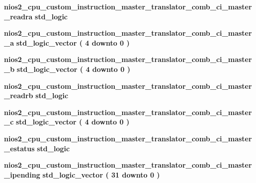 \begin{DoxyCompactItemize}
\item 
{\bf nios2\+\_\+cpu\+\_\+custom\+\_\+instruction\+\_\+master\+\_\+translator\+\_\+comb\+\_\+ci\+\_\+master\+\_\+readra} {\bfseries \textcolor{comment}{std\+\_\+logic}\textcolor{vhdlchar}{ }} 
\item 
{\bf nios2\+\_\+cpu\+\_\+custom\+\_\+instruction\+\_\+master\+\_\+translator\+\_\+comb\+\_\+ci\+\_\+master\+\_\+a} {\bfseries \textcolor{comment}{std\+\_\+logic\+\_\+vector}\textcolor{vhdlchar}{ }\textcolor{vhdlchar}{(}\textcolor{vhdlchar}{ }\textcolor{vhdlchar}{ } \textcolor{vhdldigit}{4} \textcolor{vhdlchar}{ }\textcolor{keywordflow}{downto}\textcolor{vhdlchar}{ }\textcolor{vhdlchar}{ } \textcolor{vhdldigit}{0} \textcolor{vhdlchar}{ }\textcolor{vhdlchar}{)}\textcolor{vhdlchar}{ }} 
\item 
{\bf nios2\+\_\+cpu\+\_\+custom\+\_\+instruction\+\_\+master\+\_\+translator\+\_\+comb\+\_\+ci\+\_\+master\+\_\+b} {\bfseries \textcolor{comment}{std\+\_\+logic\+\_\+vector}\textcolor{vhdlchar}{ }\textcolor{vhdlchar}{(}\textcolor{vhdlchar}{ }\textcolor{vhdlchar}{ } \textcolor{vhdldigit}{4} \textcolor{vhdlchar}{ }\textcolor{keywordflow}{downto}\textcolor{vhdlchar}{ }\textcolor{vhdlchar}{ } \textcolor{vhdldigit}{0} \textcolor{vhdlchar}{ }\textcolor{vhdlchar}{)}\textcolor{vhdlchar}{ }} 
\item 
{\bf nios2\+\_\+cpu\+\_\+custom\+\_\+instruction\+\_\+master\+\_\+translator\+\_\+comb\+\_\+ci\+\_\+master\+\_\+readrb} {\bfseries \textcolor{comment}{std\+\_\+logic}\textcolor{vhdlchar}{ }} 
\item 
{\bf nios2\+\_\+cpu\+\_\+custom\+\_\+instruction\+\_\+master\+\_\+translator\+\_\+comb\+\_\+ci\+\_\+master\+\_\+c} {\bfseries \textcolor{comment}{std\+\_\+logic\+\_\+vector}\textcolor{vhdlchar}{ }\textcolor{vhdlchar}{(}\textcolor{vhdlchar}{ }\textcolor{vhdlchar}{ } \textcolor{vhdldigit}{4} \textcolor{vhdlchar}{ }\textcolor{keywordflow}{downto}\textcolor{vhdlchar}{ }\textcolor{vhdlchar}{ } \textcolor{vhdldigit}{0} \textcolor{vhdlchar}{ }\textcolor{vhdlchar}{)}\textcolor{vhdlchar}{ }} 
\item 
{\bf nios2\+\_\+cpu\+\_\+custom\+\_\+instruction\+\_\+master\+\_\+translator\+\_\+comb\+\_\+ci\+\_\+master\+\_\+estatus} {\bfseries \textcolor{comment}{std\+\_\+logic}\textcolor{vhdlchar}{ }} 
\item 
{\bf nios2\+\_\+cpu\+\_\+custom\+\_\+instruction\+\_\+master\+\_\+translator\+\_\+comb\+\_\+ci\+\_\+master\+\_\+ipending} {\bfseries \textcolor{comment}{std\+\_\+logic\+\_\+vector}\textcolor{vhdlchar}{ }\textcolor{vhdlchar}{(}\textcolor{vhdlchar}{ }\textcolor{vhdlchar}{ } \textcolor{vhdldigit}{31} \textcolor{vhdlchar}{ }\textcolor{keywordflow}{downto}\textcolor{vhdlchar}{ }\textcolor{vhdlchar}{ } \textcolor{vhdldigit}{0} \textcolor{vhdlchar}{ }\textcolor{vhdlchar}{)}\textcolor{vhdlchar}{ }} 

\end{DoxyCompactItemize}
